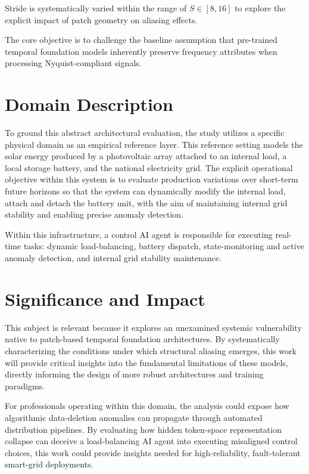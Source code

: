 Stride is systematically varied within the range of $S \in [8, 16]$ to explore the explicit impact of patch geometry on aliasing effects.

The core objective is to challenge the baseline assumption that pre-trained temporal foundation models inherently preserve frequency attributes when processing Nyquist-compliant signals.

\section{Domain Description}
To ground this abstract architectural evaluation, the study utilizes a specific physical domain as an empirical reference layer. This reference setting models the solar energy produced by a photovoltaic array attached to an internal load, a local storage battery, and the national electricity grid. The explicit operational objective within this system is to evaluate production variations over short-term future horizons so that the system can dynamically modify the internal load, attach and detach the battery unit, with the aim of maintaining internal grid stability and enabling precise anomaly detection. 

Within this infrastructure, a control AI agent is responsible for executing real-time tasks: dynamic load-balancing, battery dispatch, state-monitoring and active anomaly detection, and internal grid stability maintenance.

\section{Significance and Impact} 
This subject is relevant because it explores an unexamined systemic vulnerability native to patch-based temporal foundation architectures. By systematically characterizing the conditions under which structural aliasing emerges, this work will provide critical insights into the fundamental limitations of these models, directly informing the design of more robust architectures and training paradigms. 

For professionals operating within this domain, the analysis could expose how algorithmic data-deletion anomalies can propagate through automated distribution pipelines. By evaluating how hidden token-space representation collapse can deceive a load-balancing AI agent into executing misaligned control choices, this work could provide insights needed for high-reliability, fault-tolerant smart-grid deployments.

